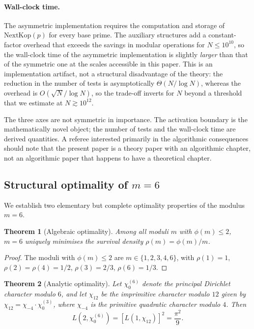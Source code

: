 \documentclass[11pt]{amsart}
\numberwithin{equation}{section}
\newcommand{\NextKop}{\mathrm{NextKop}}
\theoremstyle{plain}
\newtheorem{theorem}{Theorem}[section]
\theoremstyle{definition}
\begin{document}
\paragraph{Wall-clock time.} The asymmetric implementation requires
the computation and storage of $\NextKop(p)$ for every base prime.
The auxiliary structures add a constant-factor overhead that exceeds
the savings in modular operations for $N\le 10^{10}$, so the
wall-clock time of the asymmetric implementation is slightly
\emph{larger} than that of the symmetric one at the scales accessible
in this paper. This is an implementation artifact, not a structural
disadvantage of the theory: the reduction in the number of tests is
asymptotically $\Theta(N/\log N)$, whereas the overhead is
$O(\sqrt{N}/\log N)$, so the trade-off inverts for $N$ beyond a
threshold that we estimate at $N\gtrsim 10^{12}$.

The three axes are not symmetric in importance. The activation
boundary is the mathematically novel object; the number of tests and
the wall-clock time are derived quantities. A referee interested
primarily in the algorithmic consequences should note that the
present paper is a theory paper with an algorithmic chapter, not an
algorithmic paper that happens to have a theoretical chapter.

\subsection{Structural optimality of \texorpdfstring{$m=6$}{m=6}}
\label{subsec:optimality-m6}

We establish two elementary but complete optimality properties of the
modulus $m=6$.

\begin{theorem}[Algebraic optimality]
\label{thm:opt-algebraic}
Among all moduli $m$ with $\phi(m)\le 2$, $m=6$ uniquely minimises the
survival density $\rho(m)=\phi(m)/m$.
\end{theorem}

\begin{proof}
The moduli with $\phi(m)\le 2$ are $m\in\{1,2,3,4,6\}$, with
$\rho(1)=1$, $\rho(2)=\rho(4)=1/2$, $\rho(3)=2/3$, $\rho(6)=1/3$.
\end{proof}

\begin{theorem}[Analytic optimality]
\label{thm:opt-analytic}
Let $\chi_0^{(6)}$ denote the principal Dirichlet character modulo $6$,
and let $\chi_{12}$ be the imprimitive character modulo $12$ given by
$\chi_{12}=\chi_{-4}\cdot\chi_0^{(3)}$, where $\chi_{-4}$ is the
primitive quadratic character modulo $4$. Then
\begin{equation}
L(2,\chi_0^{(6)})=[L(1,\chi_{12})]^2=\frac{\pi^2}{9}.
\end{equation}
\end{theorem}
\end{document}
